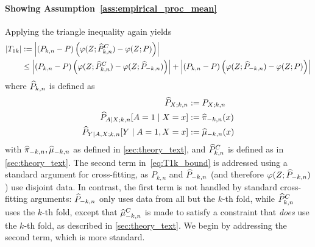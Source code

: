 \paragraph{Showing  Assumption~\ref{ass:empirical_proc_mean}}
Applying the triangle inequality again yields
\begin{align}
|T_{1k}|&:=\left|(P_{k,n}-P)\left(\varphi(Z;\widehat{P}_{k,n}^C) -\varphi(Z; P)\right)\right| \nonumber
\\&\leq \left| (P_{k,n}-P)\left( \varphi(Z;\widehat{P}_{k,n}^C) -\varphi(Z; \widehat{P}_{-k,n}) \right) \right| + 
 \left| (P_{k,n}-P)\left( \varphi(Z; \widehat{P}_{-k,n}) -\varphi(Z; P) \right) \right|
 \label{eq:T1k_bound}
\end{align}
where $\widehat{P}_{k,n}$ is defined as
\begin{align*}
\widehat{P}_{X ; k,n}&:=P_{X;k,n}\\ 
\widehat{P}_{A\mid X ; k,n}[A=1\mid X=x]&:=\widehat{\pi}_{-k,n}(x) \\ 
\widehat{P}_{Y\mid A,X ; k,n}[Y\mid A=1, X=x]&:=\widehat{\mu}_{-k,n}(x)
\end{align*}
with $\widehat{\pi}_{-k,n},\widehat{\mu}_{-k,n}$ 
as defined in \cref{sec:theory_text},
and $\widehat{P}_{k,n}^C$ is defined as in \cref{sec:theory_text}. 
The second term in~\eqref{eq:T1k_bound} is addressed 
using a standard argument for cross-fitting, as $P_{k,n}$ and $\widehat{P}_{-k,n}$ (and therefore $\varphi(Z;\widehat{P}_{-k,n})$) use disjoint data. In contrast, the first term is not handled by standard cross-fitting arguments: $\widehat{P}_{-k,n}$ only uses data from all but the $k$-th fold, while $\widehat{P}^C_{k,n}$ uses the $k$-th fold, except that $\widehat{\mu}^C_{-k,n}$ is made to satisfy a constraint that \emph{does} use the $k$-th fold, as described in \cref{sec:theory_text}. We begin by addressing the second term, which is more standard. %


